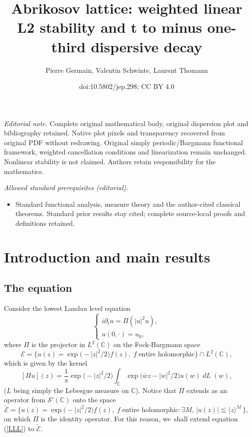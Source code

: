 \documentclass[10pt]{amsart}
\title{Abrikosov lattice: weighted linear L2 stability and t to minus one-third dispersive decay}
\author{Pierre Germain, Valentin Schwinte, Laurent Thomann}
\date{doi:10.5802/jep.298; CC BY 4.0}
\let\sep:
\DeclareMathOperator{\dL}{\mathit{dL}}
\theoremstyle{definition}
\let\EE\exp
\let\ov\overline
\let\<\langle
\let\>\rangle
\newcommand\C{\mathbb C}
\providecommand{\mainmatter}{}\providecommand{\backmatter}{}
\begin{document}
\maketitle
\noindent\textit{Editorial note.} Complete original mathematical body, original dispersion plot and bibliography retained. Native plot pixels and transparency recovered from original PDF without redrawing. Original simply periodic/Bargmann functional framework, weighted cancellation conditions and linearization remain unchanged. Nonlinear stability is not claimed. Authors retain responsibility for the mathematics.\par\medskip
\noindent\textit{Allowed standard prerequisites (editorial).}\begin{itemize}
\item Standard functional analysis, measure theory and the author-cited classical theorems. Standard prior results stay cited; complete source-local proofs and definitions retained.
\end{itemize}\medskip

\tableofcontents
\mainmatter

\section{Introduction and main results}

\subsection{The equation}

Consider the lowest Landau level equation\vspace*{-3pt}
\begin{equation}\label{LLL}\tag{LLL}
\begin{cases}
i \partial_t u = \Pi (|u|^2 u),\\
u(0,\cdot)= u_0,
\end{cases}
\end{equation}
where $\Pi$ is the projector in $L^2(\C)$ on the Fock-Bargmann space\vspace*{-3pt}
\[
\mathcal{E} =\bigl\{ u(z) = \EE\bigl(-{|z|^2}/2\bigr) f(z),\;f \; \text{entire\ holomorphic}\bigr\}\cap L^2(\C),
\]
which is given by the kernel\vspace*{-3pt}
\begin{equation}\label{defPi}
[\Pi u](z) = \frac{1}{\pi} \EE\bigl(-{|z|^2}/2\bigr) \int_\mathbb{C} \EE\bigl(\ov w z - |w|^2/2\bigr) u(w) \dL(w),
\end{equation}
($L$ being simply the Lebesgue measure on $\C$). Notice that $\Pi $ extends as an operator from $\mathscr{S}'(\C)$ onto the space\vspace*{-3pt}
\[
\widetilde {\mathcal E}=\bigl\{ u(z) =\EE\bigl(-{|z|^2}/2\bigr) f(z),\;f \; \text{entire\ holomorphic}\sep\exists M,\, \vert u(z)\vert \lesssim \< z\>^M \, \bigr\},
\]
on which $\Pi $ is the identity operator. For this reason, we~shall extend equation (\ref{LLL}) to $\widetilde {\mathcal E}$.
\end{document}
